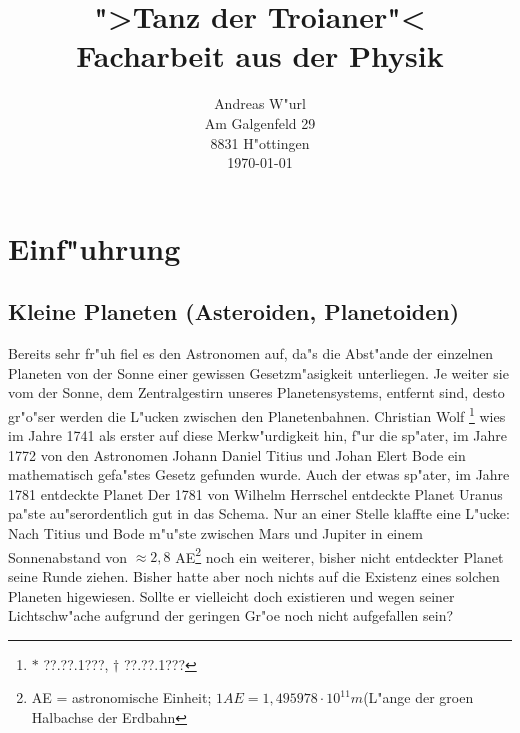 
\setleftmarginwidth{2in}



\pagestyle{myfootings}

\title{">Tanz der Troianer"<\\
	Facharbeit aus der Physik}
\author{Andreas W"url\\
	Am Galgenfeld 29\\
	8831 H"ottingen\\[0.3cm]
	\today}

\maketitle
\makeauthor

\tableofcontents


\section{Einf"uhrung}
\subsection{Kleine Planeten (Asteroiden, Planetoiden)}

Bereits sehr fr"uh fiel es den Astronomen auf, da"s die Abst"ande der einzelnen
Planeten von der Sonne einer gewissen Ge\-setz\-m"a\-sig\-keit unterliegen. Je weiter
sie vom der Sonne, dem Zentralgestirn unseres Planetensystems, entfernt sind, desto
gr"o"ser werden die L"ucken zwischen den Planetenbahnen. Christian Wolf
\footnote{$\ast$ ??.??.1???, $\dagger$ ??.??.1???} wies im Jahre 1741 als erster auf
diese Merkw"urdigkeit hin, f"ur die sp"ater, im Jahre 1772 von den Astronomen Johann
Daniel Titius und Johan Elert Bode ein mathematisch gefa"stes Gesetz gefunden wurde. Auch der etwas sp"ater, im Jahre 1781 entdeckte Planet
Der 1781 von Wilhelm Herrschel entdeckte Planet Uranus pa"ste au"serordentlich
gut in das Schema. Nur an einer Stelle klaffte eine L"ucke: Nach Titius und Bode
m"u"ste zwischen Mars und Jupiter in einem Sonnenabstand von $\approx 2,8$
AE\footnote{AE = astronomische Einheit; $1 AE = 1,495978\cdot10^{11}m$(L"ange der
gro\3en Halbachse der Erdbahn} noch ein weiterer, bisher nicht entdeckter Planet
seine Runde ziehen. Bisher hatte aber noch nichts auf die Existenz eines solchen
Planeten higewiesen. Sollte er vielleicht doch existieren und wegen seiner
Lichtschw"ache aufgrund der geringen Gr"o\3e noch nicht aufgefallen sein?

